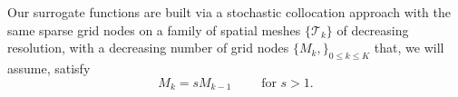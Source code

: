 \documentclass[final,3p,times,11pt]{elsarticle}
\begin{document}


Our surrogate functions are built via a stochastic collocation approach with the same sparse grid nodes on a family of spatial meshes $\{\mathcal{T}_k\}$ of decreasing resolution, with a decreasing number of grid nodes $\{M_k,\}_{0\le k \le K}$ that, we will assume, satisfy
%
\begin{equation}
\label{eq:MeshGrowth}
M_k = s M_{k-1} \qquad \text{ for } s>1.
\end{equation}
%
\end{document}
